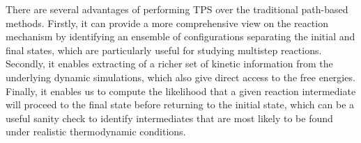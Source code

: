 There are several advantages of performing TPS over the traditional path-based methods. Firstly, it can provide a more comprehensive view on the reaction mechanism by identifying an ensemble of configurations separating the initial and final states, which are particularly useful for studying multistep reactions. Secondly, it enables extracting of a richer set of kinetic information from the underlying dynamic simulations, which also give direct access to the free energies. Finally, it enables us to compute the likelihood that a given reaction intermediate will proceed to the final state before returning to the initial state, which can be a useful sanity check to identify intermediates that are most likely to be found  under realistic thermodynamic conditions. 
